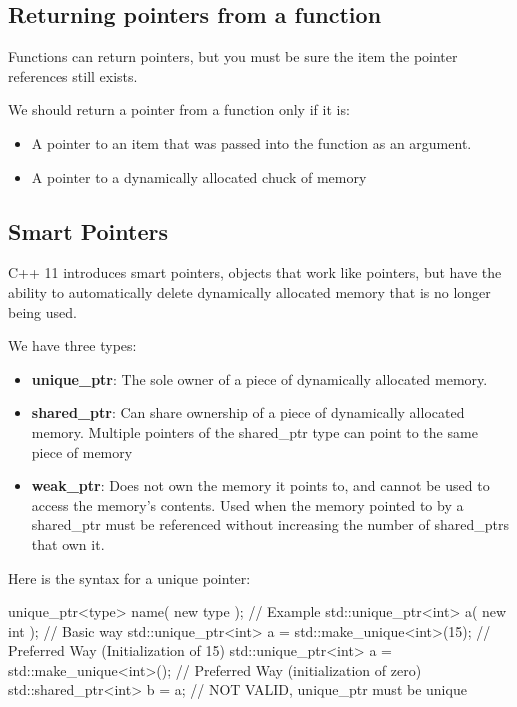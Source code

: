 \documentclass{report}
\begin{document}
    \bigbreak \noindent 
    \subsection{Returning pointers from a function}
    \bigbreak \noindent 
    \begin{concept}
 Functions can return pointers, but you must be sure the item the pointer references still exists.
	\end{concept}
    \bigbreak \noindent 
    We should return  a pointer from a function only if it is:
    \begin{itemize}
        \item A pointer to an item that was passed into the function as an argument.
        \item A pointer to a dynamically allocated chuck of memory
    \end{itemize}

    \bigbreak \noindent 
    \subsection{Smart Pointers}
    \bigbreak \noindent 
    \begin{concept}
 C++ 11 introduces smart pointers, objects that work like pointers, but have the ability to automatically delete dynamically allocated memory that is no longer being used.
	\end{concept}
    \bigbreak \noindent 
    We have three types:
    \begin{itemize}
        \item \textbf{unique\_ptr}: The sole owner of a piece of dynamically allocated memory. 
        \item \textbf{shared\_ptr}: Can share ownership of a piece of dynamically allocated memory. Multiple pointers of the shared\_ptr type can point to the same piece of memory
        \item \textbf{weak\_ptr}: Does not own the memory it points to, and cannot be used to access the memory's contents. Used when the memory pointed to by a shared\_ptr must be referenced without increasing the number of shared\_ptrs that own it.
    \end{itemize}
    \bigbreak \noindent 

    \pagebreak \bigbreak \noindent 
    Here is the syntax for a unique pointer:
    \bigbreak \noindent 
    
    \begin{cppcode}
unique_ptr<type> name( new type );
// Example
std::unique_ptr<int> a( new int ); // Basic way 
std::unique_ptr<int> a = std::make_unique<int>(15); // Preferred Way (Initialization of 15)
std::unique_ptr<int> a = std::make_unique<int>(); // Preferred Way (initialization of zero)
std::shared_ptr<int> b = a; //  NOT VALID, unique_ptr must be unique
    \end{cppcode}
    
\end{document}
